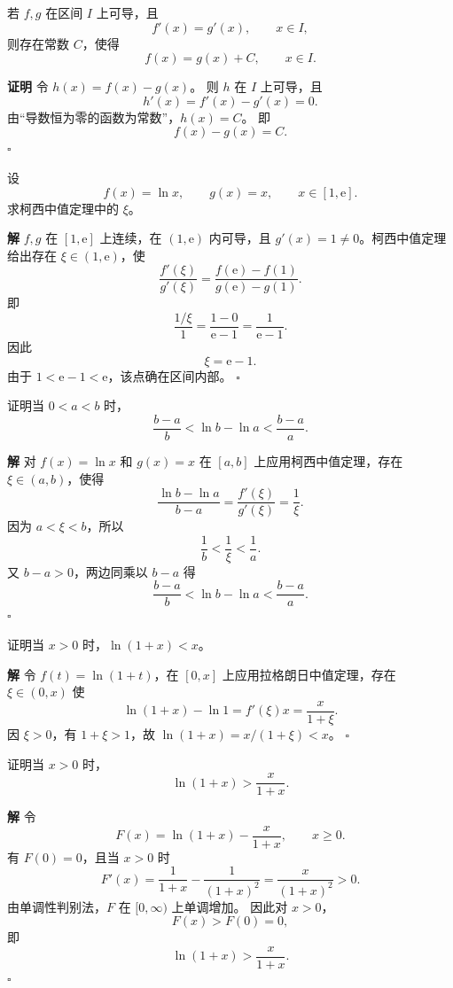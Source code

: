 \documentclass[fontset=fandol]{ctexart}
\newenvironment{proofdetail}{\par\noindent\textbf{证明}\quad}{\hfill$\square$\par\vspace{0.8em}}
\newenvironment{solution}{\par\noindent\textbf{解}\quad}{\hfill$\square$\par\vspace{0.8em}}
\newcommand{\ee}{\mathrm{e}}
\begin{document}
\begin{proposition}[导数相等的函数相差常数]
若 $f,g$ 在区间 $I$ 上可导，且
\[
f'(x)=g'(x),\qquad x\in I,
\]
则存在常数 $C$，使得
\[
f(x)=g(x)+C,\qquad x\in I.
\]
\end{proposition}
\begin{proofdetail}
令 $h(x)=f(x)-g(x)$。 则 $h$ 在 $I$ 上可导，且
\[
h'(x)=f'(x)-g'(x)=0.
\]
由“导数恒为零的函数为常数”，$h(x)=C$。 即
\[
f(x)-g(x)=C.
\]
\end{proofdetail}

\begin{example}[柯西中值定理验证]
设
\[
f(x)=\ln x,\qquad g(x)=x,\qquad x\in[1,\ee].
\]
求柯西中值定理中的 $\xi$。
\end{example}
\begin{solution}
$f,g$ 在 $[1,\ee]$ 上连续，在 $(1,\ee)$ 内可导，且 $g'(x)=1\neq0$。柯西中值定理给出存在 $\xi\in(1,\ee)$，使
\[
\frac{f'(\xi)}{g'(\xi)}
=\frac{f(\ee)-f(1)}{g(\ee)-g(1)}.
\]
即
\[
\frac{1/\xi}{1}=\frac{1-0}{\ee-1}=\frac1{\ee-1}.
\]
因此
\[
\xi=\ee-1.
\]
由于 $1<\ee-1<\ee$，该点确在区间内部。
\end{solution}

\begin{example}[用柯西中值定理证明不等式]
证明当 $0<a<b$ 时，
\[
\frac{b-a}{b}<\ln b-\ln a<\frac{b-a}{a}.
\]
\end{example}
\begin{solution}
对 $f(x)=\ln x$ 和 $g(x)=x$ 在 $[a,b]$ 上应用柯西中值定理，存在 $\xi\in(a,b)$，使得
\[
\frac{\ln b-\ln a}{b-a}=\frac{f'(\xi)}{g'(\xi)}=\frac1{\xi}.
\]
因为 $a<\xi<b$，所以
\[
\frac1b<\frac1\xi<\frac1a.
\]
又 $b-a>0$，两边同乘以 $b-a$ 得
\[
\frac{b-a}{b}<\ln b-\ln a<\frac{b-a}{a}.
\]
\end{solution}

\begin{example}[不等式]
证明当 $x>0$ 时，$\ln(1+x)<x$。
\end{example}
\begin{solution}
令 $f(t)=\ln(1+t)$，在 $[0,x]$ 上应用拉格朗日中值定理，存在 $\xi\in(0,x)$ 使
\[
\ln(1+x)-\ln1=f'(\xi)x=\frac{x}{1+\xi}.
\]
因 $\xi>0$，有 $1+\xi>1$，故 $\ln(1+x)=x/(1+\xi)<x$。
\end{solution}

\begin{example}[不等式]
证明当 $x>0$ 时，
\[
\ln(1+x)>\frac{x}{1+x}.
\]
\end{example}
\begin{solution}
令
\[
F(x)=\ln(1+x)-\frac{x}{1+x},\qquad x\geq0.
\]
有 $F(0)=0$，且当 $x>0$ 时
\[
F'(x)=\frac1{1+x}-\frac1{(1+x)^2}
=\frac{x}{(1+x)^2}>0.
\]
由单调性判别法，$F$ 在 $[0,\infty)$ 上单调增加。 因此对 $x>0$，
\[
F(x)>F(0)=0,
\]
即
\[
\ln(1+x)>\frac{x}{1+x}.
\]
\end{solution}
\end{document}
